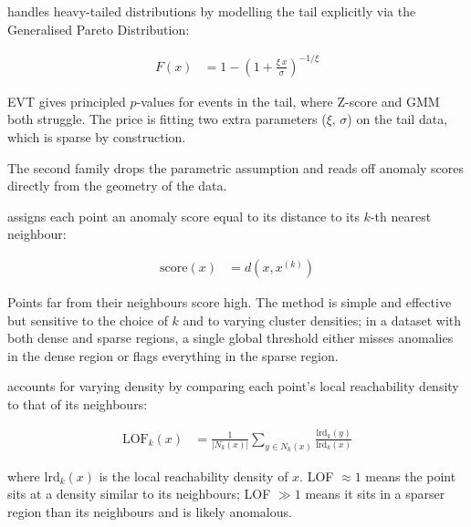  handles heavy-tailed distributions by modelling the tail explicitly via the Generalised Pareto Distribution:

\begin{align*}
    F(x) &= 1 - \left(1 + \frac{\xi\, x}{\sigma}\right)^{-1/\xi}
\end{align*}

EVT gives principled $p$-values for events in the tail, where Z-score and GMM both struggle.
The price is fitting two extra parameters ($\xi$, $\sigma$) on the tail data, which is sparse by construction.

\vspace{2.5em}
The second family drops the parametric assumption and reads off anomaly scores directly from the geometry of the data.


 assigns each point an anomaly score equal to its distance to its $k$-th nearest neighbour:

\begin{align*}
    \mathrm{score}(x) &= d(x, x^{(k)})
\end{align*}

Points far from their neighbours score high.
The method is simple and effective but sensitive to the choice of $k$ and to varying cluster densities; in a dataset with both dense and sparse regions, a single global threshold either misses anomalies in the dense region or flags everything in the sparse region.

\cite{Breunig2000} accounts for varying density by comparing each point's local reachability density to that of its neighbours:

\begin{align*}
    \mathrm{LOF}_k(x) &= \frac{1}{|N_k(x)|} \sum_{y \in N_k(x)} \frac{\mathrm{lrd}_k(y)}{\mathrm{lrd}_k(x)}
\end{align*}

where $\mathrm{lrd}_k(x)$ is the local reachability density of $x$.
LOF $\approx 1$ means the point sits at a density similar to its neighbours; LOF $\gg 1$ means it sits in a sparser region than its neighbours and is likely anomalous.

